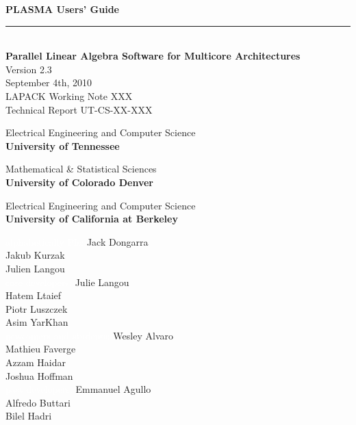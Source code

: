 \documentclass[11pt,letterpaper]{report}
\begin{document}

\thispagestyle{empty}
\begin{flushright}
\sf
\noindent
{\Huge\textbf{PLASMA Users' Guide}}
\rule[-1ex]{\textwidth}{5pt}\\[2.5ex]
{\Large\textbf{Parallel Linear Algebra Software for Multicore Architectures}} \\
\vspace{0.1in}
{\Large{Version 2.3}} \\
\vspace{0.1in}
{September 4th, 2010} \\
\vspace{0.1in}
{LAPACK Working Note XXX} \\
\vspace{0.1in}
{Technical Report UT-CS-XX-XXX} \\
\vspace{0.5in}

\noindent
Electrical Engineering and Computer Science \\
\textbf{University of Tennessee}
\vspace{0.2in}

\noindent
Mathematical \& Statistical Sciences \\
\textbf{University of Colorado Denver}
\vspace{0.2in}

\noindent
Electrical Engineering and Computer Science \\
\textbf{University of California at Berkeley}
\vspace{1.3in}

\noindent
\textcolor{white}{alphabetically}
\textcolor{white}{PIs:}
Jack Dongarra \\
Jakub Kurzak \\
Julien Langou \\

\textcolor{white}{core developers:}
Julie Langou \\
Hatem Ltaief \\
Piotr Luszczek \\
Asim YarKhan \\

\textcolor{white}{newcomers and students:}
Wesley Alvaro \\
Mathieu Faverge \\
Azzam Haidar \\
Joshua Hoffman \\

\textcolor{white}{past developers:}
Emmanuel Agullo \\
Alfredo Buttari \\
Bilel Hadri \\

\end{flushright}
\end{document}
